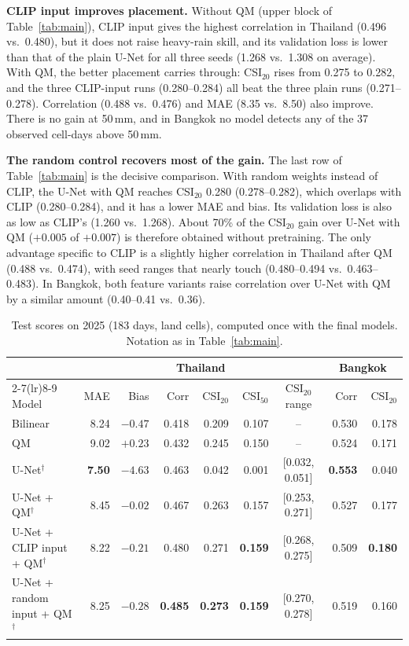 \documentclass[sigconf]{acmart}
\begin{document}
\textbf{CLIP input improves placement.} Without QM (upper block of
Table~\ref{tab:main}), CLIP input gives the
highest correlation in Thailand (0.496 vs.\ 0.480), but it does not raise
heavy-rain skill, and its validation loss is lower than that of the plain
U-Net for all three seeds (1.268 vs.\ 1.308 on average). With QM, the
better placement carries through: CSI$_{20}$ rises from 0.275 to 0.282,
and the three CLIP-input runs (0.280--0.284) all beat the three plain runs
(0.271--0.278). Correlation (0.488 vs.\ 0.476) and MAE (8.35 vs.\ 8.50)
also improve. There is no gain at 50\,mm, and in Bangkok no model detects
any of the 37 observed cell-days above 50\,mm.

\textbf{The random control recovers most of the gain.} The last row of
Table~\ref{tab:main} is the decisive comparison. With random weights
instead of CLIP, the U-Net with QM reaches CSI$_{20}$ 0.280
(0.278--0.282), which overlaps with CLIP (0.280--0.284), and it has a
lower MAE and bias. Its validation loss is also as low as CLIP's (1.260
vs.\ 1.268). About 70\% of the CSI$_{20}$ gain over U-Net with QM
($+0.005$ of $+0.007$) is therefore obtained without pretraining. The only
advantage specific to CLIP is a slightly higher correlation in Thailand
after QM (0.488 vs.\ 0.474), with seed ranges that nearly touch
(0.480--0.494 vs.\ 0.463--0.483). In Bangkok, both feature variants raise
correlation over U-Net with QM by a similar amount (0.40--0.41 vs.\ 0.36).

\begin{table}
  \caption{Test scores on 2025 (183 days, land cells), computed once with
  the final models. Notation as in Table~\ref{tab:main}.}
  \label{tab:test}
  \small
  \begin{tabular}{lrrrrrcrr}
    \toprule
    & \multicolumn{6}{c}{Thailand} & \multicolumn{2}{c}{Bangkok} \\
    \cmidrule(lr){2-7}\cmidrule(lr){8-9}
    Model & MAE & Bias & Corr & CSI$_{20}$ & CSI$_{50}$ & CSI$_{20}$ range
      & Corr & CSI$_{20}$ \\
    \midrule
    Bilinear          & 8.24 & $-0.47$ & 0.418 & 0.209 & 0.107 & -- & 0.530 & 0.178 \\
    QM                & 9.02 & $+0.23$ & 0.432 & 0.245 & 0.150 & -- & 0.524 & 0.171 \\
    U-Net$^\dagger$   & \textbf{7.50} & $-4.63$ & 0.463 & 0.042 & 0.001 & [0.032, 0.051] & \textbf{0.553} & 0.040 \\
    \midrule
    U-Net + QM$^\dagger$                & 8.45 & $\mathbf{-0.02}$ & 0.467 & 0.263 & 0.157 & [0.253, 0.271] & 0.527 & 0.177 \\
    U-Net + CLIP input + QM$^\dagger$   & 8.22 & $-0.21$ & 0.480 & 0.271 & \textbf{0.159} & [0.268, 0.275] & 0.509 & \textbf{0.180} \\
    U-Net + random input + QM$^\dagger$ & 8.25 & $-0.28$ & \textbf{0.485} & \textbf{0.273} & \textbf{0.159} & [0.270, 0.278] & 0.519 & 0.160 \\
    \bottomrule
  \end{tabular}
\end{table}
\end{document}
